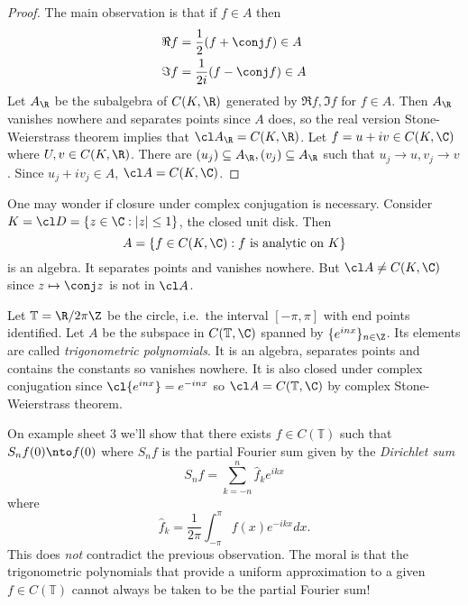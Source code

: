 \documentclass[a4paper]{article}
\begin{document}
\begin{proof}
  The main observation is that if \(f \in A\) then
  \begin{align*}
    \Re f &= \frac{1}{2} (f + \conj f) \in A \\
    \Im f &= \frac{1}{2i} (f - \conj f) \in A
  \end{align*}
  Let \(A_\R\) be the subalgebra of \(C(K, \R)\) generated by \(\Re f, \Im f\) for \(f \in A\). Then \(A_\R\) vanishes nowhere and separates points since \(A\) does, so the real version Stone-Weierstrass theorem implies that \(\cl A_\R = C(K, \R)\). Let \(f = u + iv \in C(K, \C)\) where \(U, v \in C(K, \R)\). There are \((u_j) \subseteq A_\R, (v_j) \subseteq A_\R\) such that \(u_j \to u, v_j \to v\). Since \(u_j + iv_j \in A\), \(\cl A = C(K, \C)\).
\end{proof}

\begin{eg}
  One may wonder if closure under complex conjugation is necessary. Consider \(K = \cl D = \{z \in \C: |z| \leq 1\}\), the closed unit disk. Then
  \[
    A = \{f \in C(K, \C): f \text{ is analytic on } K\}
  \]
  is an algebra. It separates points and vanishes nowhere. But \(\cl A \neq C(K, \C)\) since \(z \mapsto \conj z\) is not in \(\cl A\).
\end{eg}

\begin{eg}
  Let \(\mathbb T = \R/2\pi\Z\) be the circle, i.e.\ the interval \([-\pi, \pi]\) with end points identified. Let \(A\) be the subspace in \(C(\mathbb T, \C)\) spanned by \(\{e^{inx}\}_{n \in \Z}\). Its elements are called \emph{trigonometric polynomials}. It is an algebra, separates points and contains the constants so vanishes nowhere. It is also closed under complex conjugation since \(\cl{e^{inx}} = e^{-inx}\) so \(\cl A = C(\mathbb T, \C)\) by complex Stone-Weierstrass theorem.
\end{eg}

\begin{eg}
  On example sheet 3 we'll show that there exists \(f \in C(\mathbb T)\) such that \(S_nf(0) \nto f(0)\) where \(S_nf\) is the partial Fourier sum given by the \emph{Dirichlet sum}
  \[
    S_nf = \sum_{k = -n}^n \hat f_k e^{ikx}
  \]
  where
  \[
    \hat f_k = \frac{1}{2\pi} \int_{-\pi}^\pi f(x) e^{-ikx} dx.
  \]
  This does \emph{not} contradict the previous observation. The moral is that the trigonometric polynomials that provide a uniform approximation to a given \(f \in C(\mathbb T)\) cannot always be taken to be the partial Fourier sum!
\end{eg}
\end{document}
